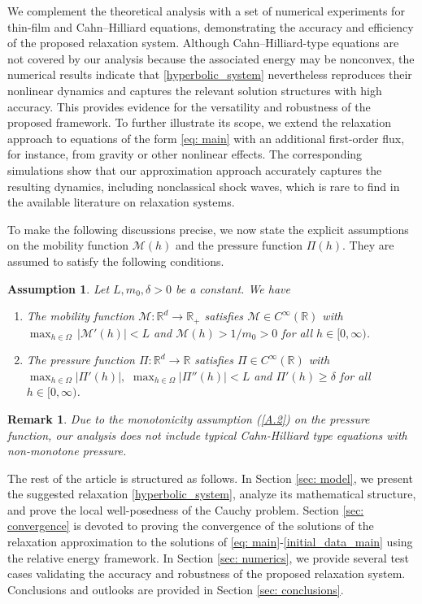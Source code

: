 \documentclass[11pt]{article}
\newtheorem{assumption}{Assumption}
\numberwithin{equation}{section}
\newtheorem{counter example}[theorem]{Counter Example}
\newtheorem{remark}[theorem] {Remark}
\numberwithin{equation}{section}
\numberwithin{equation}{section}
\begin{document}
We complement the theoretical analysis with a set of numerical experiments for thin-film and Cahn--Hilliard equations, demonstrating the accuracy and efficiency of the proposed relaxation system. Although Cahn--Hilliard-type equations are not covered by our analysis because the associated energy may be nonconvex, the numerical results indicate that \eqref{hyperbolic_system} nevertheless reproduces their nonlinear dynamics and captures the relevant solution structures with high accuracy. This provides evidence for the versatility and robustness of the proposed framework. To further illustrate its scope, we extend the relaxation approach to equations of the form \eqref{eq: main} with an additional first-order flux, for instance, from gravity or other nonlinear effects. The corresponding simulations show that our approximation approach accurately captures the resulting dynamics, including nonclassical shock waves, which is rare to find in the available literature on relaxation systems.


To make the following discussions precise, we now state the explicit assumptions on the mobility function $\mathcal{M}(h)$ and the pressure function $\Pi(h)$. They are assumed to satisfy the following conditions.
\begin{assumption}\label{assumption.A}
\leavevmode
Let $L, m_0, \delta>0$ be a constant. We have
\begin{enumerate}[label=($\mathcal{A}.\arabic*$),ref=$\mathcal{A}.\arabic*$]
  \item\label{A.1}The mobility function $\mathcal{M}:\mathbb{R}^d\to\mathbb{R}_+$ satisfies $\mathcal{M}\in C^\infty(\mathbb{R})$ with $\max_{h\in \Omega}\,\lvert \mathcal{M}'(h)\rvert < L$ and $\mathcal{M}(h)>1/m_0>0$ for all $h\in [0, \infty)$.
  \item\label{A.2} The pressure function $\Pi:\mathbb{R}^d\to\mathbb{R}$ satisfies $\Pi\in C^\infty(\mathbb{R})$ with $\max_{h\in \Omega}\lvert \Pi'(h)\rvert,\,\, \max_{h\in \Omega}\lvert \Pi''(h)\rvert  < L$ and $\Pi'(h)\geq \delta$ for all $h\in [0, \infty)$.
\end{enumerate}
\end{assumption}
\begin{remark}
Due to the monotonicity assumption (\ref{A.2}) on the pressure function, our analysis does not include typical Cahn-Hilliard type equations with non-monotone pressure.   
\end{remark}
The rest of the article is structured as follows. In Section \ref{sec: model}, we present the suggested relaxation \eqref{hyperbolic_system}, analyze its mathematical structure, and prove the local well-posedness of the Cauchy problem. 
Section \ref{sec: convergence} is devoted to proving the convergence of the solutions of the relaxation approximation to the solutions of \eqref{eq: main}-\eqref{initial_data_main} using the relative energy framework. In Section \ref{sec: numerics}, we provide several test cases validating the accuracy and robustness of the proposed relaxation system. Conclusions and outlooks are provided in Section \ref{sec: conclusions}.
\end{document}

